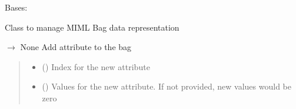\documentclass[letterpaper,10pt,english]{sphinxmanual}
\begin{document}
\begin{fulllineitems}
\label{\detokenize{data/_autosummary/miml.data.bag.Bag:miml.data.bag.Bag}}
\pysigstartsignatures
\pysiglinewithargsret
{}
{}
{}
\pysigstopsignatures
\sphinxAtStartPar
Bases: 

\sphinxAtStartPar
Class to manage MIML Bag data representation

\begin{fulllineitems}
\label{\detokenize{data/_autosummary/miml.data.bag.Bag:miml.data.bag.Bag.add_attribute}}
\pysigstartsignatures
\pysiglinewithargsret
{}
{\sphinxparamcomma {}}
{{ $\rightarrow$ None}}
\pysigstopsignatures
\sphinxAtStartPar
Add attribute to the bag
\begin{quote}\begin{description}
\begin{itemize}
\item {} 
\sphinxAtStartPar
{} () \textendash{} Index for the new attribute

\item {} 
\sphinxAtStartPar
{} (\sphinxstyleliteralemphasis{\sphinxupquote{ (}}\sphinxstyleliteralemphasis{\sphinxupquote{)}}) \textendash{} Values for the new attribute. If not provided, new values would be zero

\end{itemize}

\end{description}\end{quote}

\end{fulllineitems}


\end{fulllineitems}
\end{document}
